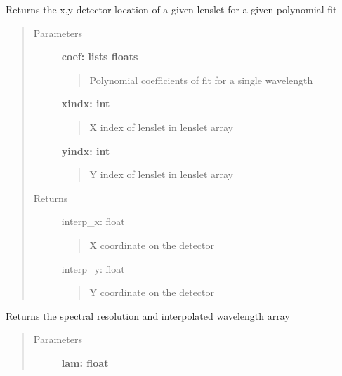 \documentclass[letterpaper,10pt,english]{sphinxmanual}
\begin{document}
\begin{fulllineitems}

\begin{fulllineitems}
\label{tools:tools.locate_psflets.PSFLets.return_locations_short}
Returns the x,y detector location of a given lenslet for a given polynomial fit
\begin{quote}\begin{description}
\item[{Parameters}] \leavevmode
\textbf{coef: lists floats}
\begin{quote}

Polynomial coefficients of fit for a single wavelength
\end{quote}

\textbf{xindx: int}
\begin{quote}

X index of lenslet in lenslet array
\end{quote}

\textbf{yindx: int}
\begin{quote}

Y index of lenslet in lenslet array
\end{quote}

\item[{Returns}] \leavevmode
interp\_x: float
\begin{quote}

X coordinate on the detector
\end{quote}

interp\_y: float
\begin{quote}

Y coordinate on the detector
\end{quote}

\end{description}\end{quote}

\end{fulllineitems}


\begin{fulllineitems}
\label{tools:tools.locate_psflets.PSFLets.return_res}
Returns the spectral resolution and interpolated wavelength array
\begin{quote}\begin{description}
\item[{Parameters}] \leavevmode
\textbf{lam: float}
\begin{quote}


\end{quote}
\end{description}
\end{quote}
\end{fulllineitems}
\end{fulllineitems}
\end{document}
